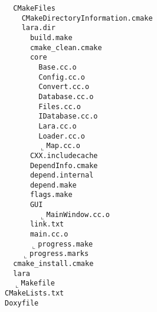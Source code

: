 \documentclass[german,a4paper]{report}
\begin{document}
\begin{alltt}
\textbar\ \      \textbar\textendash\textendash CMakeFiles
\textbar\ \      \textbar\ \  \textbar\textendash\textendash CMakeDirectoryInformation.cmake
\textbar\ \      \textbar\ \  \textbar\textendash\textendash lara.dir
\textbar\ \      \textbar\ \  \textbar\ \  \textbar\textendash\textendash build.make
\textbar\ \      \textbar\ \  \textbar\ \  \textbar\textendash\textendash cmake\_clean.cmake
\textbar\ \      \textbar\ \  \textbar\ \  \textbar\textendash\textendash core
\textbar\ \      \textbar\ \  \textbar\ \  \textbar\ \  \textbar\textendash\textendash Base.cc.o
\textbar\ \      \textbar\ \  \textbar\ \  \textbar\ \  \textbar\textendash\textendash Config.cc.o
\textbar\ \      \textbar\ \  \textbar\ \  \textbar\ \  \textbar\textendash\textendash Convert.cc.o
\textbar\ \      \textbar\ \  \textbar\ \  \textbar\ \  \textbar\textendash\textendash Database.cc.o
\textbar\ \      \textbar\ \  \textbar\ \  \textbar\ \  \textbar\textendash\textendash Files.cc.o
\textbar\ \      \textbar\ \  \textbar\ \  \textbar\ \  \textbar\textendash\textendash IDatabase.cc.o
\textbar\ \      \textbar\ \  \textbar\ \  \textbar\ \  \textbar\textendash\textendash Lara.cc.o
\textbar\ \      \textbar\ \  \textbar\ \  \textbar\ \  \textbar\textendash\textendash Loader.cc.o
\textbar\ \      \textbar\ \  \textbar\ \  \textbar\ \  \(\llcorner\)\textendash\textendash Map.cc.o
\textbar\ \      \textbar\ \  \textbar\ \  \textbar\textendash\textendash CXX.includecache
\textbar\ \      \textbar\ \  \textbar\ \  \textbar\textendash\textendash DependInfo.cmake
\textbar\ \      \textbar\ \  \textbar\ \  \textbar\textendash\textendash depend.internal
\textbar\ \      \textbar\ \  \textbar\ \  \textbar\textendash\textendash depend.make
\textbar\ \      \textbar\ \  \textbar\ \  \textbar\textendash\textendash flags.make
\textbar\ \      \textbar\ \  \textbar\ \  \textbar\textendash\textendash GUI
\textbar\ \      \textbar\ \  \textbar\ \  \textbar\ \  \(\llcorner\)\textendash\textendash MainWindow.cc.o
\textbar\ \      \textbar\ \  \textbar\ \  \textbar\textendash\textendash link.txt
\textbar\ \      \textbar\ \  \textbar\ \  \textbar\textendash\textendash main.cc.o
\textbar\ \      \textbar\ \  \textbar\ \  \(\llcorner\)\textendash\textendash progress.make
\textbar\ \      \textbar\ \  \(\llcorner\)\textendash\textendash progress.marks
\textbar\ \      \textbar\textendash\textendash cmake\_install.cmake
\textbar\ \      \textbar\textendash\textendash lara
\textbar\ \      \(\llcorner\)\textendash\textendash Makefile
\textbar\textendash\textendash CMakeLists.txt
\textbar\textendash\textendash Doxyfile

\end{alltt}
\end{document}
